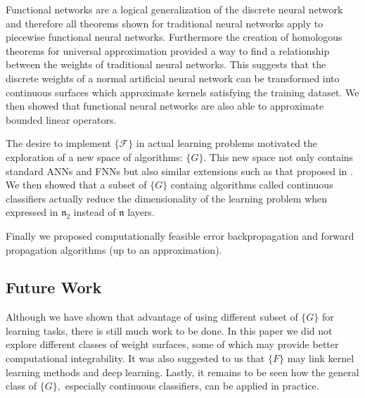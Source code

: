 \documentclass{article}
\begin{document}
 Functional networks are a logical generalization of the discrete neural network and therefore all theorems shown for traditional neural networks apply to piecewise functional neural networks. Furthermore the creation of homologous theorems for universal approximation provided a way to find a relationship between the weights of traditional neural networks. This suggests that the discrete weights of a normal artificial neural network can be transformed into continuous surfaces which approximate kernels satisfying the training dataset. We then showed that functional neural networks are also able to approximate bounded linear operators.

The desire to implement $\{\mathcal{F}\}$ in actual learning problems motivated the exploration of a new space of algorithms: $\{G\}.$ This new space not only contains standard ANNs and FNNs but also similar extensions such as that proposed in \cite{roux}. We then showed that a subset of $\{G\}$ containg algorithms called continuous classifiers actually reduce the dimensionality of the learning problem when expressed in $\mathfrak{n}_2$ instead of $\mathfrak{n}$ layers. 

Finally  we proposed computationally feasible error backpropagation and forward propagation algorithms (up to an approximation).


\subsection{Future Work}
Although we have shown that advantage of using different subset of $\{G\}$ for learning tasks, there is still much work to be done. In this paper we did not explore different classes of weight surfaces, some of which may provide better computational integrability. It was also suggested to us that $\{F\}$ may link kernel learning methods and deep learning. Lastly, it remains to be seen how the general class of $\{G\},$ especially continuous classifiers, can be applied in practice.

\nocite{langley00}



\end{document}
